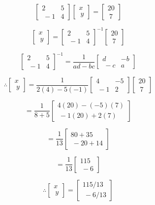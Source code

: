 $$
\begin{bmatrix}
2 & 5 \\\
-1 & 4
\end{bmatrix}
\begin{bmatrix}
x \\\
y
\end{bmatrix}
=
\begin{bmatrix}
20 \\\
7
\end{bmatrix}
$$

$$
\begin{bmatrix}
x \\\
y
\end{bmatrix}
=
\begin{bmatrix}
2 & 5 \\\
-1 & 4
\end{bmatrix}
^{-1}
\begin{bmatrix}
20 \\\
7
\end{bmatrix}
$$

$$
\begin{bmatrix}
2 & 5 \\\
-1 & 4
\end{bmatrix}
^{-1}
=
\frac{1}{ad-bc}
\begin{bmatrix}
d & -b \\\
-c & a
\end{bmatrix}
$$

$$
\therefore
\begin{bmatrix}
x \\\
y
\end{bmatrix}
=
\frac{1}{2(4)-5(-1)}
\begin{bmatrix}
4 & -5 \\\
-1 & 2
\end{bmatrix}
\begin{bmatrix}
20 \\\
7
\end{bmatrix}
$$

$$
=
\frac{1}{8+5}
\begin{bmatrix}
4(20)-(-5)(7) \\\
-1(20)+2(7)
\end{bmatrix}
$$

$$
=
\frac{1}{13}
\begin{bmatrix}
80+35 \\\
-20+14
\end{bmatrix}
$$

$$
=
\frac{1}{13}
\begin{bmatrix}
115 \\\
-6
\end{bmatrix}
$$

$$
\therefore
\begin{bmatrix}
x \\\
y
\end{bmatrix}
=
\begin{bmatrix}
115/13 \\\
-6/13
\end{bmatrix}
$$
